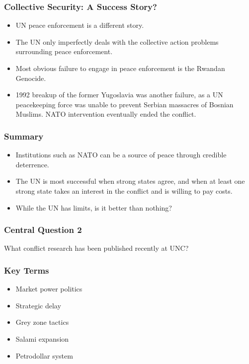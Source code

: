 \documentclass[handout]{beamer}
\begin{document}
\begin{frame} 
	\frametitle{\LARGE{Collective Security: A Success Story?}}
	\begin{itemize}
		\item UN peace enforcement is a different story. \pause
		\item The UN only imperfectly deals with the collective action problems surrounding peace enforcement. \pause
		\item Most obvious failure to engage in peace enforcement is the Rwandan Genocide. \pause
		\item 1992 breakup of the former Yugoslavia was another failure, as a UN peacekeeping force was unable to prevent Serbian massacres of Bosnian Muslims. NATO intervention eventually ended the conflict.
	\end{itemize}
\end{frame}

\begin{frame} 
	\frametitle{\LARGE{Summary}}
	\begin{itemize}
		\item Institutions such as NATO can be a source of peace through credible deterrence. \pause
		\item The UN is most successful when strong states agree, and when at least one strong state takes an interest in the conflict and is willing to pay costs. \pause
		\item While the UN has limits, is it better than nothing?		
	\end{itemize}
\end{frame}

\begin{frame} 
	\frametitle{\LARGE{Central Question 2}}
	\centering
	\Large{What conflict research has been published recently at UNC?}
\end{frame}

\begin{frame} 
	\frametitle{\LARGE{Key Terms}}
	\begin{itemize}
		\item Market power politics
		\item Strategic delay
		\item Grey zone tactics
		\item Salami expansion
		\item Petrodollar system
	\end{itemize}
\end{frame}
\end{document}

